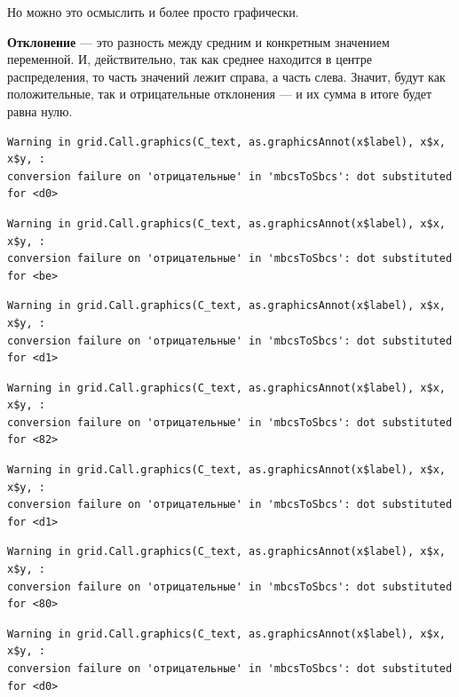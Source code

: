 \documentclass[
  letterpaper,
  DIV=11,
  numbers=noendperiod]{scrreprt}
\theoremstyle{definition}
\theoremstyle{remark}
\begin{document}
Но можно это осмыслить и более просто графически.

\textbf{Отклонение} --- это разность между средним и конкретным
значением переменной. И, действительно, так как среднее находится в
центре распределения, то часть значений лежит справа, а часть слева.
Значит, будут как положительные, так и отрицательные отклонения --- и их
сумма в итоге будет равна нулю.

\begin{verbatim}
Warning in grid.Call.graphics(C_text, as.graphicsAnnot(x$label), x$x, x$y, :
conversion failure on 'отрицательные' in 'mbcsToSbcs': dot substituted for <d0>
\end{verbatim}

\begin{verbatim}
Warning in grid.Call.graphics(C_text, as.graphicsAnnot(x$label), x$x, x$y, :
conversion failure on 'отрицательные' in 'mbcsToSbcs': dot substituted for <be>
\end{verbatim}

\begin{verbatim}
Warning in grid.Call.graphics(C_text, as.graphicsAnnot(x$label), x$x, x$y, :
conversion failure on 'отрицательные' in 'mbcsToSbcs': dot substituted for <d1>
\end{verbatim}

\begin{verbatim}
Warning in grid.Call.graphics(C_text, as.graphicsAnnot(x$label), x$x, x$y, :
conversion failure on 'отрицательные' in 'mbcsToSbcs': dot substituted for <82>
\end{verbatim}

\begin{verbatim}
Warning in grid.Call.graphics(C_text, as.graphicsAnnot(x$label), x$x, x$y, :
conversion failure on 'отрицательные' in 'mbcsToSbcs': dot substituted for <d1>
\end{verbatim}

\begin{verbatim}
Warning in grid.Call.graphics(C_text, as.graphicsAnnot(x$label), x$x, x$y, :
conversion failure on 'отрицательные' in 'mbcsToSbcs': dot substituted for <80>
\end{verbatim}

\begin{verbatim}
Warning in grid.Call.graphics(C_text, as.graphicsAnnot(x$label), x$x, x$y, :
conversion failure on 'отрицательные' in 'mbcsToSbcs': dot substituted for <d0>
\end{verbatim}
\end{document}
